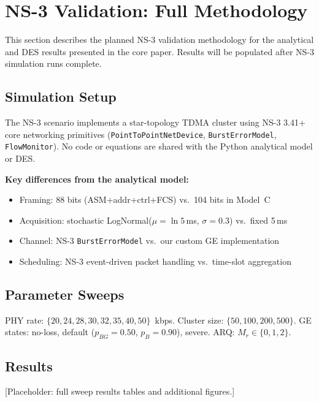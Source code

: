 \documentclass[journal]{IEEEtran}
\begin{document}
\section{NS-3 Validation: Full Methodology}
\label{sec:supp-ns3}

This section describes the planned NS-3 validation methodology for the analytical and DES results presented in the core paper. Results will be populated after NS-3 simulation runs complete.


\subsection{Simulation Setup}
The NS-3 scenario implements a star-topology TDMA cluster using NS-3 3.41+
core networking primitives (\texttt{PointToPointNetDevice},
\texttt{BurstErrorModel}, \texttt{FlowMonitor}). No code or equations
are shared with the Python analytical model or DES.

\textbf{Key differences from the analytical model:}
\begin{itemize}
    \item Framing: 88 bits (ASM+addr+ctrl+FCS) vs.\ 104 bits in Model~C
    \item Acquisition: stochastic LogNormal($\mu = \ln 5$\,ms, $\sigma = 0.3$) vs.\ fixed 5\,ms
    \item Channel: NS-3 \texttt{BurstErrorModel} vs.\ our custom GE implementation
    \item Scheduling: NS-3 event-driven packet handling vs.\ time-slot aggregation
\end{itemize}

\subsection{Parameter Sweeps}
PHY rate: $\{20, 24, 28, 30, 32, 35, 40, 50\}$~kbps.
Cluster size: $\{50, 100, 200, 500\}$.
GE states: no-loss, default ($p_{BG} = 0.50$, $p_B = 0.90$), severe.
ARQ: $M_r \in \{0, 1, 2\}$.

\subsection{Results}
[Placeholder: full sweep results tables and additional figures.]
\end{document}

